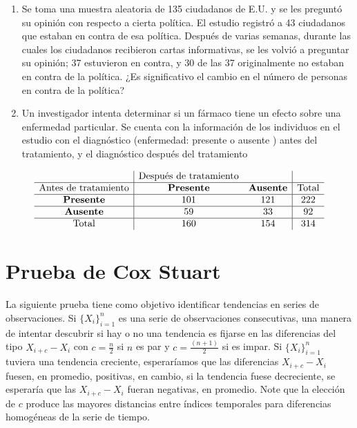 \documentclass[
  a4paper,
  oneside,
  openany]{book}
\begin{document}
\begin{enumerate}
\def\labelenumi{\arabic{enumi}.}
\item
  Se toma una muestra aleatoria de 135 ciudadanos de E.U. y se les preguntó su opinión con respecto a cierta política. El estudio registró a 43 ciudadanos que estaban en contra de esa política. Después de varias semanas, durante las cuales los ciudadanos recibieron cartas informativas, se les volvió a preguntar su opinión; 37 estuvieron en contra, y 30 de las 37 originalmente no estaban en contra de la política. ¿Es significativo el cambio en el número de personas en contra de la política?
\item
  Un investigador intenta determinar si un fármaco tiene un efecto sobre una enfermedad particular. Se cuenta con la información de los individuos en el estudio con el diagnóstico (enfermedad: presente o ausente ) antes del tratamiento, y el diagnóstico después del tratamiento
\end{enumerate}

\[
\begin{array}{c| c c|c} 
&\mbox{Después de tratamiento}&&\\
\hline
\mbox{Antes de tratamiento}& \textbf{Presente} & \textbf{Ausente} & \mbox{Total} \\  
\hline
\textbf{Presente} & 101& 121&222\\
\hline
\textbf{Ausente} & 59& 33&92\\
\hline
\mbox{Total}&160&154&314\\
\end{array}
\]

\hypertarget{prueba-de-cox-stuart}{%
\chapter{Prueba de Cox Stuart}\label{prueba-de-cox-stuart}}

La siguiente prueba tiene como objetivo identificar tendencias en series de observaciones.
Si \(\{X_{i}\}^{n}_{i=1}\) es una serie de observaciones consecutivas, una manera de
intentar descubrir si hay o no una tendencia es fijarse en las diferencias del tipo \(X_{i+c} - X_{i}\) con \(c = \frac{n}{2}\) si \(n\) es par y \(c =\frac{(n + 1)}{2}\) si es impar.
Si \(\{X_{i}\}^{n}_{i=1}\) tuviera una tendencia creciente, esperaríamos que las diferencias \(X_{i+c} - X_{i}\) fuesen, en promedio, positivas, en cambio, si la tendencia fuese decreciente, se esperaría que las \(X_{i+c} - X_{i}\) fueran negativas, en promedio.
Note que la elección de \(c\) produce las mayores distancias entre índices temporales para diferencias homogéneas de la serie de tiempo.
\end{document}
